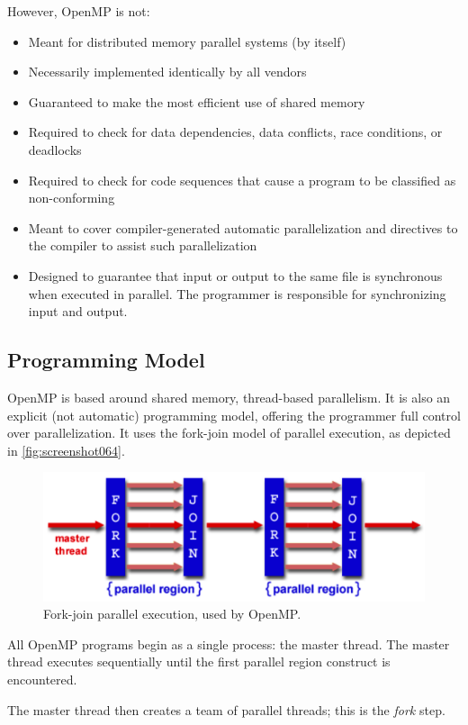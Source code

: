 However, OpenMP is not: \begin{itemize}
\item Meant for distributed memory parallel systems (by itself)  
\item Necessarily implemented identically by all vendors  
\item Guaranteed to make the most efficient use of shared memory  
\item Required to check for data dependencies, data conflicts, race conditions, or deadlocks  
\item Required to check for code sequences that cause a program to be classified as non-conforming  
\item Meant to cover compiler-generated automatic parallelization and directives to the compiler to assist such parallelization  
\item Designed to guarantee that input or output to the same file is synchronous when executed in parallel. The programmer is responsible for synchronizing input and output.  
\end{itemize}

\subsection{Programming Model}
OpenMP is based around shared memory, thread-based parallelism. It is also an explicit (not automatic) programming model, offering the programmer full control over parallelization. It uses the fork-join model of parallel execution, as depicted in \autoref{fig:screenshot064}.

\begin{figure}
\centering
\includegraphics[width=0.7\linewidth]{figures/screenshot064}
\caption{Fork-join parallel execution, used by OpenMP.}
\label{fig:screenshot064}
\end{figure}

All OpenMP programs begin as a single process: the master thread. The master thread executes sequentially until the first parallel region construct is encountered.

The master thread then creates a team of parallel threads; this is the \textit{fork} step.

